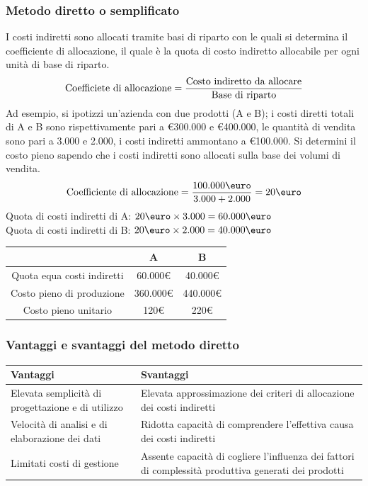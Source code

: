 \documentclass{article}
\begin{document}
\subsubsection{Metodo diretto o semplificato}
I costi indiretti sono allocati tramite basi di riparto con le quali si determina il coefficiente di allocazione, il quale è la quota di costo indiretto allocabile per ogni unità di base di riparto. 
\[
    \text{Coefficiete di allocazione} = \frac{\text{Costo indiretto da allocare}}{\text{Base di riparto}}
\]
Ad esempio, si ipotizzi un'azienda con due prodotti (A e B); i costi diretti totali di A e B sono rispettivamente pari a €300.000 e €400.000, le quantità di vendita sono pari a 3.000 e 2.000, i costi indiretti ammontano a €100.000. Si determini il costo pieno sapendo che i costi indiretti sono allocati sulla base dei volumi di vendita.
\[
    \T{Coefficiente di allocazione} = \frac{100.000\T{\euro}}{3.000+2.000} = 20 \T{\euro}  
\]
Quota di costi indiretti di A: $20\T{\euro} \times 3.000  = 60.000 \T{\euro}$\\
Quota di costi indiretti di B: $20\T{\euro} \times 2.000  = 40.000 \T{\euro}$\\
\begin{center}
    \begin{tabular}{|c|c|c|}
        \hline 
        & A & B \\ \hline
        Quota equa costi indiretti & 60.000\euro & 40.000\euro \\ \hline
        Costo pieno di produzione & 360.000\euro & 440.000\euro \\ \hline
        Costo pieno unitario & 120\euro & 220\euro\\ \hline 
    \end{tabular}
\end{center}


\subsubsection{Vantaggi e svantaggi del metodo diretto}
\begin{center}
    \begin{tabular}{|m{5cm}|m{5cm}|}
        \hline 
        \textbf{Vantaggi} & \textbf{Svantaggi} \\ \hline
        Elevata semplicità di progettazione e di utilizzo & Elevata approssimazione dei criteri di allocazione dei costi indiretti \\ 
        Velocità di analisi e di elaborazione dei dati & Ridotta capacità di comprendere l'effettiva causa dei costi indiretti \\ 
        Limitati costi di gestione & Assente capacità di cogliere l'influenza dei fattori di complessità produttiva generati dei prodotti\\ \hline 
    \end{tabular}
\end{center}
\end{document}
